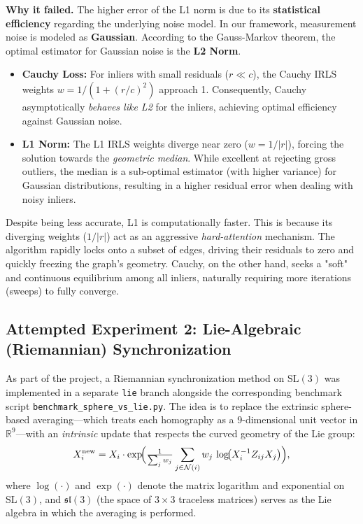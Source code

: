 \documentclass[11pt, a4paper]{article}
\begin{document}
\textbf{Why it failed.}
The higher error of the L1 norm is due to its \textbf{statistical efficiency} regarding the underlying noise model. 
In our framework, measurement noise is modeled as \textbf{Gaussian}. According to the Gauss-Markov theorem, the optimal estimator for Gaussian noise is the \textbf{L2 Norm}.
\begin{itemize}
    \item \textbf{Cauchy Loss:} For inliers with small residuals ($r \ll c$), the Cauchy IRLS weights $w = 1 / (1 + (r / c)^2)$ approach 1. Consequently, Cauchy asymptotically \textit{behaves like L2} for the inliers, achieving optimal efficiency against Gaussian noise.
    \item \textbf{L1 Norm:} The L1 IRLS weights diverge near zero ($w = 1/|r|$), forcing the solution towards the \textit{geometric median}. While excellent at rejecting gross outliers, the median is a sub-optimal estimator (with higher variance) for Gaussian distributions, resulting in a higher residual error when dealing with noisy inliers.
\end{itemize}
Despite being less accurate, L1 is computationally faster. This is because its diverging weights ($1/|r|$) act as an aggressive \textit{hard-attention} mechanism. The algorithm rapidly locks onto a subset of edges, driving their residuals to zero and quickly freezing the graph's geometry. Cauchy, on the other hand, seeks a "soft" and continuous equilibrium among all inliers, naturally requiring more iterations (sweeps) to fully converge.
\subsection{Attempted Experiment 2: Lie-Algebraic (Riemannian) Synchronization}
\label{sec:exp_lie}

As part of the project, a Riemannian synchronization method on $\mathrm{SL}(3)$
was implemented in a separate \texttt{lie} branch alongside the corresponding
benchmark script \texttt{benchmark\_sphere\_vs\_lie.py}.  The idea is to replace
the extrinsic sphere-based averaging---which treats each homography as a
9-dimensional unit vector in $\mathbb{R}^9$---with an \emph{intrinsic} update
that respects the curved geometry of the Lie group:
\begin{equation}
    X_i^{\text{new}} = X_i \cdot \exp\!\Bigl(
        \tfrac{1}{\sum_j w_j} \sum_{j \in \mathcal{N}(i)}
        w_j \, \log\!\bigl(X_i^{-1} Z_{ij} X_j\bigr)
    \Bigr),
\end{equation}
where $\log(\cdot)$ and $\exp(\cdot)$ denote the matrix logarithm and exponential
on $\mathrm{SL}(3)$, and $\mathfrak{sl}(3)$ (the space of $3\times3$ traceless
matrices) serves as the Lie algebra in which the averaging is performed.
\end{document}

